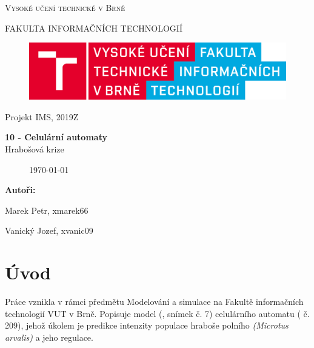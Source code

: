 \documentclass[a4paper,11pt]{article}
\begin{document}

\begin{titlepage}
\begin{center}
    {\Huge \textsc{Vysoké učení technické v Brně}}
    
    {\LARGE \uppercase{FAKULTA INFORMAČNÍCH TECHNOLOGIÍ}}
    
\begin{figure}[h]
\vspace{5.0cm}
\centering
\includegraphics[scale=0.15]{logo.png}
\vspace{-10.0cm}
\end{figure}
    
	{\LARGE Projekt IMS, 2019Z}

	{\Huge \textbf{10 - Celulární automaty}}
\\

{\LARGE {Hrabošová krize}}\\

\begin{figure}[h]
\centering
{\Large {\mydate\today}}
\vspace{6cm}
\end{figure}

\end{center}
\begin{compactitem}
\item[] \textbf{Autoři:}
\item[] Marek Petr, xmarek66
\item[] Vanický Jozef, xvanic09
\end{compactitem}

\end{titlepage}

\tableofcontents
\newpage

\section{Úvod}
Práce vznikla v rámci předmětu Modelování a simulace na Fakultě informačních technologií VUT v Brně. Popisuje model (\cite{slajdy}, snímek č. 7) celulárního automatu (\cite{slajdy} č. 209), jehož úkolem je predikce intenzity populace hraboše polního \textit{(Microtus arvalis)} a jeho regulace. 
\end{document}
